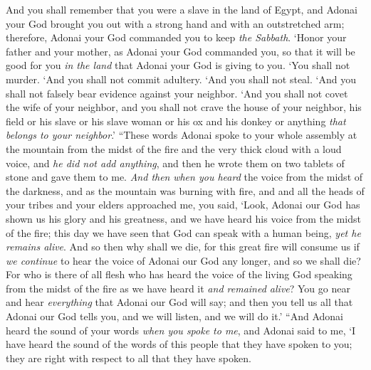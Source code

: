 \begin{biblechapter}
\verse And you shall remember that you were a slave in the land of Egypt, and Adonai your God brought you out with a strong hand and with an outstretched arm; therefore, Adonai your God commanded you to keep \textit{the Sabbath}.
\verse ‘Honor your father and your mother, as Adonai your God commanded you, so that it will be good for you \textit{in the land} that Adonai your God is giving to you.
\verse ‘You shall not murder.
\verse ‘And you shall not commit adultery.
\verse ‘And you shall not steal.
\verse ‘And you shall not falsely bear evidence against your neighbor.
\verse ‘And you shall not covet the wife of your neighbor, and you shall not crave the house of your neighbor, his field or his slave or his slave woman or his ox and his donkey or anything \textit{that belongs to your neighbor}.’
\verse “These words Adonai spoke to your whole assembly at the mountain from the midst of the fire and the very thick cloud with a loud voice, and \textit{he did not add anything}, and then he wrote them on two tablets of stone and gave them to me.
\verse \textit{And then} \textit{when you heard} the voice from the midst of the darkness, and as the mountain was burning with fire, and and all the heads of your tribes and your elders approached me,
\verse you said, ‘Look, Adonai our God has shown us his glory and his greatness, and we have heard his voice from the midst of the fire; this day we have seen that God can speak with a human being, \textit{yet he remains alive}.
\verse And so then why shall we die, for this great fire will consume us if \textit{we continue} to hear the voice of Adonai our God any longer, and so we shall die?
\verse For who is there of all flesh who has heard the voice of the living God speaking from the midst of the fire as we have heard it \textit{and remained alive}?
\verse You go near and hear \textit{everything} that Adonai our God will say; and then you tell us all that Adonai our God tells you, and we will listen, and we will do it.’
\verse “And Adonai heard the sound of your words \textit{when you spoke to me}, and Adonai said to me, ‘I have heard the sound of the words of this people that they have spoken to you; they are right with respect to all that they have spoken.

\end{biblechapter}
